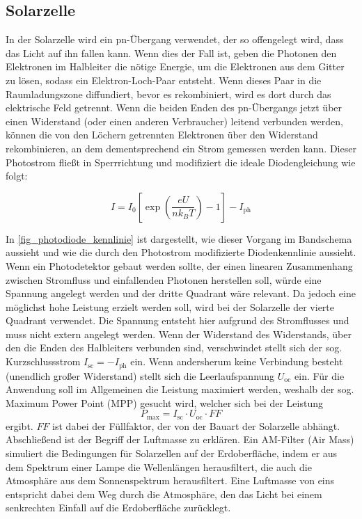 \documentclass[
	a4paper,
	12pt,
	pagesize,
	ngerman
]{scrartcl}
\begin{document}
	\subsection{Solarzelle}

	In der Solarzelle wird ein pn-Übergang verwendet, der so offengelegt wird, dass das Licht auf ihn fallen kann.
	Wenn dies der Fall ist, geben die Photonen den Elektronen im Halbleiter die nötige Energie, um die Elektronen aus dem Gitter zu lösen, sodass ein Elektron-Loch-Paar entsteht.
	Wenn dieses Paar in die Raumladungszone diffundiert, bevor es rekombiniert, wird es dort durch das elektrische Feld getrennt.
	Wenn die beiden Enden des pn-Übergangs jetzt über einen Widerstand (oder einen anderen Verbraucher) leitend verbunden werden, können die von den Löchern getrennten Elektronen über den Widerstand rekombinieren, an dem dementsprechend ein Strom gemessen werden kann.
	Dieser Photostrom fließt in Sperrrichtung und modifiziert die ideale Diodengleichung \label{eq_diode_real} wie folgt:

	\begin{equation}
			\label{eq_photostrom}
			I = I_0 \left[\exp{\left(\frac{eU}{n k_B T}\right)}-1\right]-I_\text{ph}
	\end{equation}

	In \cref{fig_photodiode_kennlinie} ist dargestellt, wie dieser Vorgang im Bandschema aussieht und wie die durch den Photostrom modifizierte Diodenkennlinie aussieht.
	Wenn ein Photodetektor gebaut werden sollte, der einen linearen Zusammenhang zwischen Stromfluss und einfallenden Photonen herstellen soll, würde eine Spannung angelegt werden und der dritte Quadrant wäre relevant.
	Da jedoch eine möglichst hohe Leistung erzielt werden soll, wird bei der Solarzelle der vierte Quadrant verwendet.
	Die Spannung entsteht hier aufgrund des Stromflusses und muss nicht extern angelegt werden.
	Wenn der Widerstand des Widerstands, über den die Enden des Halbleiters verbunden sind, verschwindet stellt sich der sog. Kurzschlussstrom $ I_\text{sc} = - I_\text{ph}$ ein. %
	Wenn andersherum keine Verbindung besteht (unendlich großer Widerstand) stellt sich die Leerlaufspannung $ U_\text{oc}$ ein.
	Für die Anwendung soll im Allgemeinen die Leistung maximiert werden, weshalb der sog. Maximum Power Point (MPP) gesucht wird, welcher sich bei der Leistung
	\begin{equation}
			\label{eq_mpp}
			P_\text{max} = I_\text{sc} \cdot U_\text{oc} \cdot FF
	\end{equation}
	ergibt.
	$FF$ ist dabei der Füllfaktor, der von der Bauart der Solarzelle abhängt.
	Abschließend ist der Begriff der Luftmasse zu erklären.
	Ein AM-Filter (Air Mass) simuliert die Bedingungen für Solarzellen auf der Erdoberfläche, indem er aus dem Spektrum einer Lampe die Wellenlängen herausfiltert, die auch die Atmosphäre aus dem Sonnenspektrum herausfiltert.
	Eine Luftmasse von eins entspricht dabei dem Weg durch die Atmosphäre, den das Licht bei einem senkrechten Einfall auf die Erdoberfläche zurücklegt.
\end{document}
